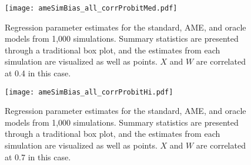 \begin{enumerate}
\begin{itemize}
			\begin{figure}[ht]
			\caption{Regression parameter estimates for the standard, AME, and oracle models from 1,000 simulations. Summary statistics are presented through a traditional box plot, and the estimates from each simulation are visualized as well as points. $X$ and $W$ are correlated at 0.4 in this case.}
			\label{fig:ameBias_corrMed}
			\texttt{[image: ameSimBias\_all\_corrProbitMed.pdf]} \\
			\end{figure}

			\begin{figure}[ht]
			\caption{Regression parameter estimates for the standard, AME, and oracle models from 1,000 simulations. Summary statistics are presented through a traditional box plot, and the estimates from each simulation are visualized as well as points. $X$ and $W$ are correlated at 0.7 in this case.}
			\label{fig:ameBias_corrHi}
			\texttt{[image: ameSimBias\_all\_corrProbitHi.pdf]} \\
			\end{figure}
			\FloatBarrier


\end{itemize}
\end{enumerate}
